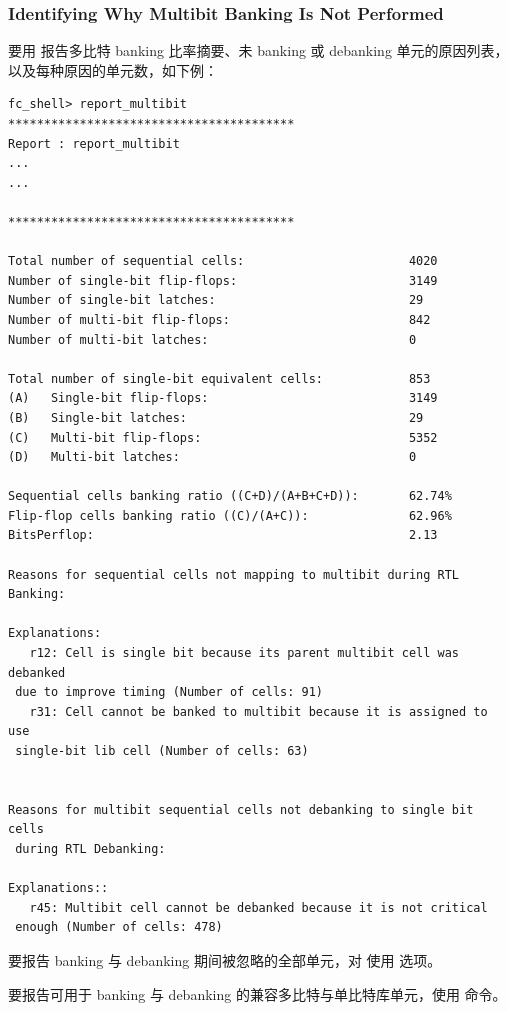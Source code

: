 \subsubsection*{Identifying Why Multibit Banking Is Not Performed}

要用  报告多比特 banking 比率摘要、未 banking 或 debanking 单元的原因列表，以及每种原因的单元数，如下例：
\begin{lstlisting}
fc_shell> report_multibit
****************************************
Report : report_multibit
...
...

****************************************

Total number of sequential cells:                       4020
Number of single-bit flip-flops:                        3149
Number of single-bit latches:                           29
Number of multi-bit flip-flops:                         842
Number of multi-bit latches:                            0

Total number of single-bit equivalent cells:            853
(A)   Single-bit flip-flops:                            3149
(B)   Single-bit latches:                               29
(C)   Multi-bit flip-flops:                             5352
(D)   Multi-bit latches:                                0

Sequential cells banking ratio ((C+D)/(A+B+C+D)):       62.74%
Flip-flop cells banking ratio ((C)/(A+C)):              62.96%
BitsPerflop:                                            2.13

Reasons for sequential cells not mapping to multibit during RTL Banking:

Explanations:
   r12: Cell is single bit because its parent multibit cell was debanked
 due to improve timing (Number of cells: 91)
   r31: Cell cannot be banked to multibit because it is assigned to use
 single-bit lib cell (Number of cells: 63)


Reasons for multibit sequential cells not debanking to single bit cells
 during RTL Debanking:

Explanations::
   r45: Multibit cell cannot be debanked because it is not critical
 enough (Number of cells: 478)
\end{lstlisting}

要报告 banking 与 debanking 期间被忽略的全部单元，对  使用  选项。

要报告可用于 banking 与 debanking 的兼容多比特与单比特库单元，使用  命令。

